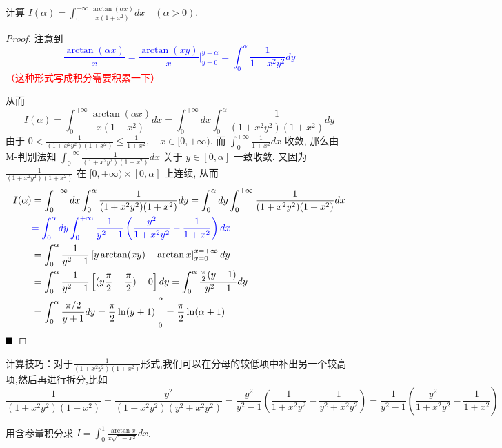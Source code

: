 \documentclass[lang=cn,newtx,10pt,scheme=chinese]{elegantbook}
\begin{document}
\begin{example}[$\bigstar \bigstar$]
计算 $I(\alpha) = \int_{0}^{+\infty} \frac{\arctan(\alpha x)}{x(1+x^2)} dx \quad (\alpha > 0)$.
\end{example}

\begin{proof}
注意到
\textcolor{blue}{$$ \frac{\arctan(\alpha x)}{x} = \frac{\arctan(xy)}{x}\Bigg|_{y=0}^{y=\alpha} = \int_0^\alpha \frac{1}{1+x^2y^2} dy $$}
\textcolor{red}{（这种形式写成积分需要积累一下）}

从而
$$ I(\alpha) = \int_0^{+\infty} \frac{\arctan(\alpha x)}{x(1+x^2)} dx = \int_0^{+\infty} dx \int_0^\alpha \frac{1}{(1+x^2y^2)(1+x^2)} dy $$
由于 $0 < \frac{1}{(1+x^2y^2)(1+x^2)} \le \frac{1}{1+x^2}, \quad x \in [0, +\infty)$.
而 $\int_0^{+\infty} \frac{1}{1+x^2} dx$ 收敛, 那么由 M-判别法知 $\int_0^{+\infty} \frac{1}{(1+x^2y^2)(1+x^2)} dx$ 关于 $y \in [0, \alpha]$ 一致收敛.
又因为 $\frac{1}{(1+x^2y^2)(1+x^2)}$ 在 $[0, +\infty) \times [0, \alpha]$ 上连续, 从而
\begin{align*}
I(\alpha) &= \int_0^{+\infty} dx \int_0^\alpha \frac{1}{(1+x^2y^2)(1+x^2)} dy = \int_0^\alpha dy \int_0^{+\infty} \frac{1}{(1+x^2y^2)(1+x^2)} dx \\
&\textcolor{blue}{= \int_0^\alpha dy \int_0^{+\infty} \frac{1}{y^2-1} \left(\frac{y^2}{1+x^2y^2} - \frac{1}{1+x^2}\right) dx} \\
&= \int_0^\alpha \frac{1}{y^2-1} \left[ y \arctan(xy) - \arctan x \right]_{x=0}^{x=+\infty} dy \\
&= \int_0^\alpha \frac{1}{y^2-1} \left[ (y\frac{\pi}{2} - \frac{\pi}{2}) - 0 \right] dy = \int_0^\alpha \frac{\frac{\pi}{2}(y-1)}{y^2-1} dy \\
&= \int_0^\alpha \frac{\pi/2}{y+1} dy = \frac{\pi}{2} \ln(y+1) \Bigg|_0^\alpha = \frac{\pi}{2} \ln(\alpha+1)
\end{align*}
$\hfill \blacksquare$
\end{proof}
\begin{note}
    计算技巧：对于$\frac{1}{(1+x^2y^2)(1+x^2)}$形式,我们可以在分母的较低项中补出另一个较高项,然后再进行拆分,比如$$\frac{1}{(1+x^2y^2)(1+x^2)} = \frac{y^2}{(1+x^2y^2)(y^2+x^2y^2)} = \frac{y^2}{y^2-1} \left(\frac{1}{1+x^2y^2} - \frac{1}{y^2+x^2y^2}\right) = \frac{1}{y^2-1} \left(\frac{y^2}{1+x^2y^2} - \frac{1}{1+x^2}\right)$$
\end{note}

\begin{example}[$\bigstar$]
用含参量积分求 $I = \int_{0}^{1} \frac{\arctan x}{x \sqrt{1-x^2}} dx$.
\end{example}
\end{document}
